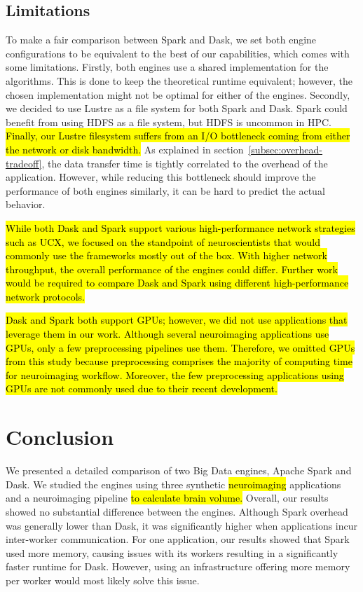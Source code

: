 \documentclass[AMA,STIX1COL]{WileyNJD-v2}
\newcommand{\HL}[1]{\hl{#1}}
\begin{document}
\subsection{Limitations}
To make a fair comparison between Spark and Dask, we set both engine configurations
to be equivalent to the best of our capabilities, which comes with some limitations.
Firstly, both engines use a shared implementation for the algorithms.
This is done to keep the theoretical runtime equivalent; however, the chosen
implementation might not be optimal for either of the engines.
Secondly, we decided to use Lustre as a file system for both Spark and Dask.
Spark could benefit from using HDFS as a file system, but HDFS is uncommon in HPC.
\HL{Finally, our Lustre filesystem suffers from an I/O bottleneck coming from 
either the network or disk bandwidth.}
As explained in section~{\ref{subsec:overhead-tradeoff}}, the data transfer 
time is tightly correlated to the overhead of the application.
However, while reducing this bottleneck should improve the performance of 
both engines similarly, it can be hard to predict the actual behavior.

\HL{
	While both Dask and Spark support various high-performance network strategies
    such as UCX, we focused on the standpoint of neuroscientists that would 
    commonly use the frameworks mostly out of the box.
    With higher network throughput, the overall performance of the engines could differ.
    Further work would be required to compare Dask and Spark using different high-performance
    network protocols.
}
			
\HL{
	Dask and Spark both support GPUs; however, we did not use applications that
    leverage them in our work.
    Although several neuroimaging applications use GPUs, only a few preprocessing pipelines use them.
    Therefore, we omitted GPUs from this study because preprocessing comprises the majority of computing time for neuroimaging
    workflow.
    Moreover, the few preprocessing applications using GPUs are not commonly used
    due to their recent development.
}
											
\section{Conclusion}
We presented a detailed comparison of two Big Data engines, Apache Spark and Dask.
We studied the engines using three synthetic \HL{neuroimaging} applications and 
a neuroimaging pipeline \HL{to calculate brain volume.}
Overall, our results showed no substantial difference between the engines.
Although Spark overhead was generally lower than Dask, it was significantly higher when applications incur inter-worker communication.
For one application, our results showed that Spark used more memory, causing issues with its workers resulting in a significantly faster runtime for Dask.
However, using an infrastructure offering more memory per worker would most likely solve this issue.
																					
\end{document}
